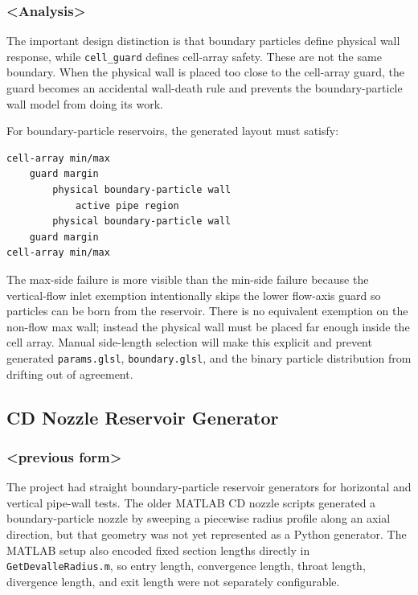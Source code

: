 \subsubsection{<Analysis>}

The important design distinction is that boundary particles define physical
wall response, while \texttt{cell\_guard} defines cell-array safety.  These are
not the same boundary.  When the physical wall is placed too close to the
cell-array guard, the guard becomes an accidental wall-death rule and prevents
the boundary-particle wall model from doing its work.

For boundary-particle reservoirs, the generated layout must satisfy:
\begin{verbatim}
cell-array min/max
    guard margin
        physical boundary-particle wall
            active pipe region
        physical boundary-particle wall
    guard margin
cell-array min/max
\end{verbatim}

The max-side failure is more visible than the min-side failure because the
vertical-flow inlet exemption intentionally skips the lower flow-axis guard so
particles can be born from the reservoir.  There is no equivalent exemption on
the non-flow max wall; instead the physical wall must be placed far enough
inside the cell array.  Manual side-length selection will make this explicit
and prevent generated \texttt{params.glsl}, \texttt{boundary.glsl}, and the
binary particle distribution from drifting out of agreement.

\subsection{CD Nozzle Reservoir Generator}

\subsubsection{<previous form>}

The project had straight boundary-particle reservoir generators for horizontal
and vertical pipe-wall tests.  The older MATLAB CD nozzle scripts generated a
boundary-particle nozzle by sweeping a piecewise radius profile along an axial
direction, but that geometry was not yet represented as a Python generator.
The MATLAB setup also encoded fixed section lengths directly in
\texttt{GetDevalleRadius.m}, so entry length, convergence length, throat
length, divergence length, and exit length were not separately configurable.

